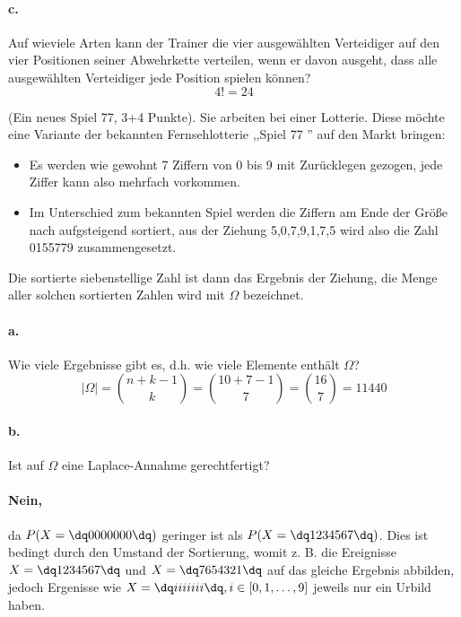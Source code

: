 \documentclass[twoside]{article}
\begin{document}
\paragraph{c.}
Auf wieviele Arten kann der Trainer die vier ausgewählten Verteidiger auf den vier Positionen seiner Abwehrkette verteilen, wenn er davon ausgeht, dass alle ausgewählten Verteidiger jede Position spielen können?
\[
	4! = 24
\]


(Ein neues Spiel 77, 3+4 Punkte).
Sie arbeiten bei einer Lotterie.
Diese möchte eine Variante der bekannten Fernsehlotterie ,,Spiel 77 '' auf den Markt bringen:
\begin{itemize}
	\item Es werden wie gewohnt 7 Ziffern von 0 bis 9 mit Zurücklegen gezogen, jede Ziffer kann also mehrfach vorkommen.
	\item Im Unterschied zum bekannten Spiel werden die Ziffern am Ende der Größe nach aufgsteigend sortiert, aus der Ziehung 5,0,7,9,1,7,5 wird also die Zahl 0155779 zusammengesetzt.
\end{itemize}
Die sortierte siebenstellige Zahl ist dann das Ergebnis der Ziehung, die Menge aller solchen sortierten Zahlen wird mit $\Omega$ bezeichnet.
\paragraph{a.}
Wie viele Ergebnisse gibt es, d.h. wie viele Elemente enthält $\Omega$?
\[
	|\Omega|=\binom{n+k-1}{k}=\binom{10+7-1}{7}=\binom{16}{7}=11440
\]
\paragraph{b.}
Ist auf $\Omega$ eine Laplace-Annahme gerechtfertigt?
\paragraph{Nein,} da $P(X=\dq 0000000\dq)$ geringer ist als $P(X=\dq 1234567\dq)$.
Dies ist bedingt durch den Umstand der Sortierung, womit z. B. die Ereignisse $X=\dq 1234567\dq$ und $X=\dq 7654321\dq$ auf das gleiche Ergebnis abbilden, jedoch Ergenisse wie $X=\dq iiiiiii\dq, i \in [0,1,\dots,9]$ jeweils nur ein Urbild haben.
\end{document}
